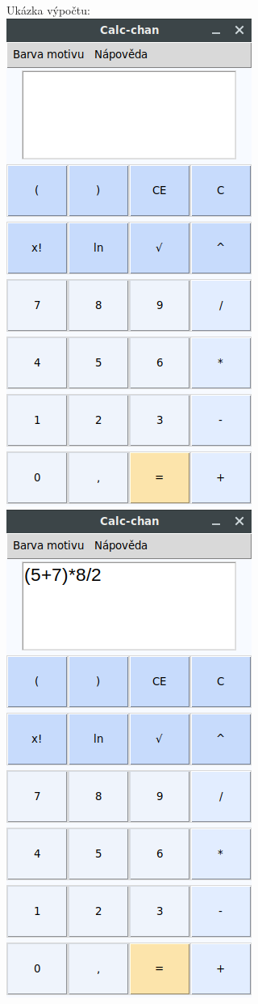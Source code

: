 \documentclass[a4paper, 11pt]{article}
\begin{document}
\newpage
Ukázka výpočtu:\vspace{20pt}\\
\includegraphics[scale=0.5]{calc1.png}
\hspace{10pt}
\includegraphics[scale=0.5]{calc2.png}
\end{document}
